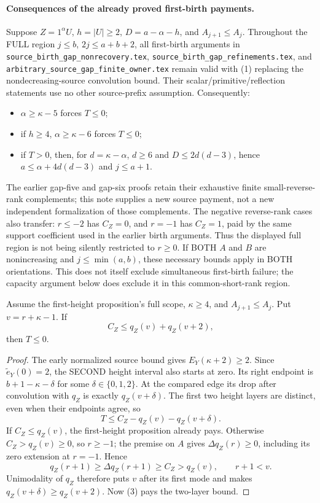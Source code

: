 \paragraph{Consequences of the already proved first-birth payments.}
Suppose $Z=1^\alpha U$, $h=|U|\ge2$, $D=a-\alpha-h$,
and $A_{j+1}\le A_j$. Throughout the FULL region
$j\le b$, $2j\le a+b+2$,
all first-birth arguments in \texttt{source\_birth\_gap\_nonrecovery.tex},
\texttt{source\_birth\_gap\_refinements.tex}, and
\texttt{arbitrary\_source\_gap\_finite\_owner.tex} remain valid
with (1) replacing the nondecreasing-source convolution bound.
Their scalar/primitive/reflection statements use no other source-prefix
assumption. Consequently:
\begin{itemize}
\item $\alpha\ge\kappa-5$ forces $T\le0$;
\item if $h\ge4$, $\alpha\ge\kappa-6$ forces $T\le0$;
\item if $T>0$, then, for $d=\kappa-\alpha$,
      $d\ge6$ and $D\le2d(d-3)$, hence
      $a\le\alpha+4d(d-3)$ and $j\le a+1$.
\end{itemize}
The earlier gap-five and gap-six proofs retain their exhaustive finite
small-reverse-rank complements; this note supplies a new source payment,
not a new independent formalization of those complements.
The negative reverse-rank cases also transfer: $r\le-2$ has
$C_Z=0$, and $r=-1$ has $C_Z=1$, paid by the same support
coefficient used in the earlier birth arguments. Thus the displayed
full region is not being silently restricted to $r\ge0$.
If BOTH $A$ and $B$ are nonincreasing and $j\le\min(a,b)$, these
necessary bounds apply in BOTH orientations. This does not itself
exclude simultaneous first-birth failure; the capacity argument below
does exclude it in this common-short-rank region.

\begin{proposition}
Assume the first-height proposition's full scope, $\kappa\ge4$,
and $A_{j+1}\le A_j$. Put $v=r+\kappa-1$. If
\[
                         C_Z\le q_Z(v)+q_Z(v+2),     \tag{3}
\]
then $T\le0$.
\end{proposition}
\begin{proof}
The early normalized source bound gives $E_Y(\kappa+2)\ge2$.
Since $\widetilde e_Y(0)=2$, the SECOND height interval also
starts at zero. Its right endpoint is $b+1-\kappa-\delta$
for some $\delta\in\{0,1,2\}$. At the compared edge its drop
after convolution with $q_Z$ is exactly $q_Z(v+\delta)$.
The first two height layers are distinct, even when their
endpoints agree, so
\[
                T\le C_Z-q_Z(v)-q_Z(v+\delta).
\]
If $C_Z\le q_Z(v)$, the first-height proposition already pays.
Otherwise $C_Z>q_Z(v)\ge0$, so $r\ge-1$; the premise on $A$
gives $\Delta q_Z(r)\ge0$, including its zero extension at $r=-1$.
Hence
\[
 q_Z(r+1)\ge\Delta q_Z(r+1)\ge C_Z>q_Z(v),
 \qquad r+1<v.
\]
Unimodality of $q_Z$ therefore puts $v$ after its first mode
and makes $q_Z(v+\delta)\ge q_Z(v+2)$.
Now (3) pays the two-layer bound.
\end{proof}

